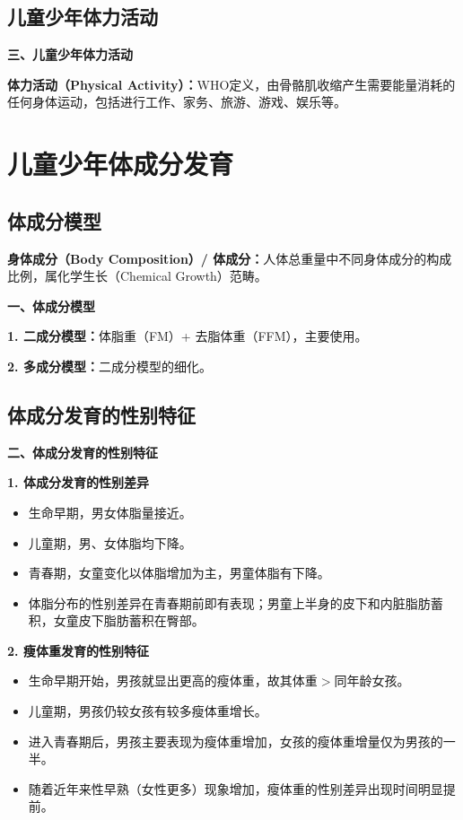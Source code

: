 \subsection{儿童少年体力活动}

\begin{keybox}
\textbf{三、儿童少年体力活动}

\textbf{体力活动（Physical Activity）：}WHO定义，由骨骼肌收缩产生需要能量消耗的任何身体运动，包括进行工作、家务、旅游、游戏、娱乐等。
\end{keybox}

\section{儿童少年体成分发育}

\subsection{体成分模型}

\begin{defbox}
\textbf{身体成分（Body Composition）/ 体成分：}人体总重量中不同身体成分的构成比例，属化学生长（Chemical Growth）范畴。

\textbf{一、体成分模型}

\textbf{1. 二成分模型：}体脂重（FM）+ 去脂体重（FFM），主要使用。

\textbf{2. 多成分模型：}二成分模型的细化。
\end{defbox}

\subsection{体成分发育的性别特征}

\begin{defbox}
\textbf{二、体成分发育的性别特征}

\textbf{1. 体成分发育的性别差异}
\begin{itemize}[leftmargin=*]
    \item 生命早期，男女体脂量接近。
    \item 儿童期，男、女体脂均下降。
    \item 青春期，女童变化以体脂增加为主，男童体脂有下降。
    \item 体脂分布的性别差异在青春期前即有表现；男童上半身的皮下和内脏脂肪蓄积，女童皮下脂肪蓄积在臀部。
\end{itemize}

\textbf{2. 瘦体重发育的性别特征}
\begin{itemize}[leftmargin=*]
    \item 生命早期开始，男孩就显出更高的瘦体重，故其体重$>$同年龄女孩。
    \item 儿童期，男孩仍较女孩有较多瘦体重增长。
    \item 进入青春期后，男孩主要表现为瘦体重增加，女孩的瘦体重增量仅为男孩的一半。
    \item 随着近年来性早熟（女性更多）现象增加，瘦体重的性别差异出现时间明显提前。
\end{itemize}
\end{defbox}

